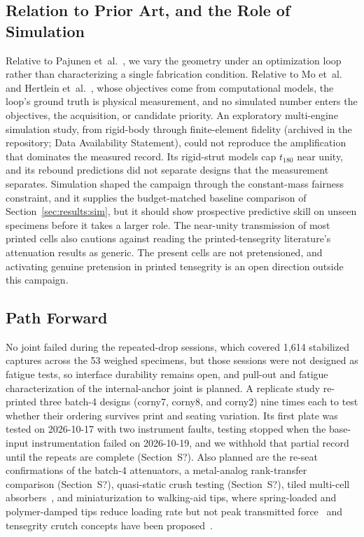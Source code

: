 \documentclass[11pt]{article}
\providecommand{\siref}[1]{S?}
\begin{document}
\subsection{Relation to Prior Art, and the Role of Simulation}
Relative
to Pajunen et~al.~\cite{pajunen2019design}, we vary the geometry under an
optimization loop rather than characterizing a single fabrication
condition. Relative to Mo et~al.~\cite{mo2023accelerated} and Hertlein
et~al.~\cite{hertlein2024latticeimpact}, whose objectives come from
computational models, the loop's ground truth is physical measurement,
and no simulated number enters the objectives, the acquisition, or
candidate priority. An exploratory
multi-engine simulation study, from rigid-body through finite-element
fidelity (archived in the repository; Data Availability Statement),
could not reproduce the amplification that dominates the measured
record. Its rigid-strut models cap $t_{180}$ near unity, and its rebound
predictions did not separate designs that the measurement separates.
Simulation shaped the campaign through the constant-mass fairness
constraint, and it supplies the budget-matched baseline comparison of
Section~\ref{sec:results:sim}, but it should show prospective predictive
skill on unseen specimens before it takes a larger role. The near-unity
transmission of most printed cells also cautions against reading the
printed-tensegrity literature's attenuation results as generic. The
present cells are not pretensioned, and activating genuine pretension in
printed tensegrity is an open direction outside this campaign.

\subsection{Path Forward}
No joint failed during the repeated-drop
sessions, which covered 1,614 stabilized captures across the 53 weighed
specimens, but those sessions were
not designed as fatigue tests, so interface durability remains open, and
pull-out and fatigue characterization of the internal-anchor joint is
planned. A replicate study re-printed three batch-4 designs (corny7,
corny8, and corny2) nine times each to test whether their ordering
survives print and seating variation. Its first plate was tested on
2026-10-17 with two instrument faults, testing stopped when the
base-input instrumentation failed on 2026-10-19, and we withhold that
partial record until the repeats are complete
(Section~\siref{si:rankstability}). Also planned are the re-seat confirmations of the batch-4
attenuators, a metal-analog rank-transfer comparison
(Section~\siref{si:metal-validation}), quasi-static crush testing
(Section~\siref{si:quasistatic}), tiled multi-cell
absorbers~\citep{sabounizawadzka2024experimental}, and miniaturization
to walking-aid tips, where spring-loaded and polymer-damped tips reduce
loading rate but not peak transmitted
force~\citep{segura2007mechanicsofambulation,
macgillivray2016theinfluenceof} and tensegrity crutch concepts have been
proposed~\citep{gu2026tensegritycrutches}.
\end{document}
